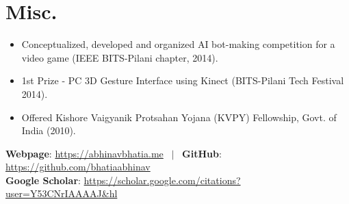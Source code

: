 \documentclass[letterpaper,11pt]{article}
\begin{document}
\section*{Misc.}
\vspace{-0.5em}
\begin{itemize}
    \setlength\itemsep{0em}
  \item Conceptualized, developed and organized AI bot-making competition for a video game (IEEE BITS-Pilani chapter, 2014).
  \item 1st Prize - PC 3D Gesture Interface using Kinect (BITS-Pilani Tech Festival 2014).
  \item Offered Kishore Vaigyanik Protsahan Yojana (KVPY) Fellowship, Govt. of India (2010).
\end{itemize}
\textbf{Webpage}: \href{https://abhinavbhatia.me}{https://abhinavbhatia.me} \ $|$ \ \textbf{GitHub}: \href{https://github.com/bhatiaabhinav}{https://github.com/bhatiaabhinav} \\
\textbf{Google Scholar}: \href{https://scholar.google.com/citations?user=Y53CNrIAAAAJ\&hl}{https://scholar.google.com/citations?user=Y53CNrIAAAAJ\&hl}
\end{document}
